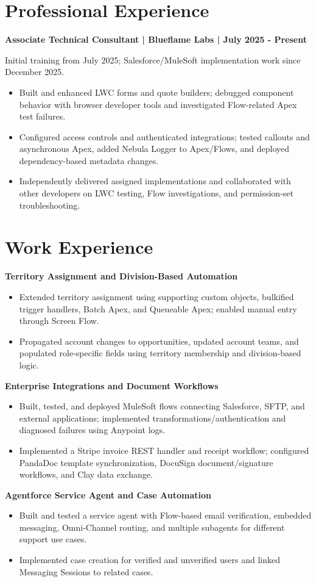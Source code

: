 \documentclass[a4paper,11pt]{article}
\begin{document}
\section{Professional Experience}
\textbf{Associate Technical Consultant | Blueflame Labs | July 2025 - Present}\par
Initial training from July 2025; Salesforce/MuleSoft implementation work since December 2025.\par
\begin{itemize}
\item Built and enhanced LWC forms and quote builders; debugged component behavior with browser developer tools and investigated Flow-related Apex test failures.
\item Configured access controls and authenticated integrations; tested callouts and asynchronous Apex, added Nebula Logger to Apex/Flows, and deployed dependency-based metadata changes.
\item Independently delivered assigned implementations and collaborated with other developers on LWC testing, Flow investigations, and permission-set troubleshooting.
\end{itemize}
\section{Work Experience}
\textbf{Territory Assignment and Division-Based Automation}\par
\begin{itemize}
\item Extended territory assignment using supporting custom objects, bulkified trigger handlers, Batch Apex, and Queueable Apex; enabled manual entry through Screen Flow.
\item Propagated account changes to opportunities, updated account teams, and populated role-specific fields using territory membership and division-based logic.
\end{itemize}
\textbf{Enterprise Integrations and Document Workflows}\par
\begin{itemize}
\item Built, tested, and deployed MuleSoft flows connecting Salesforce, SFTP, and external applications; implemented transformations/authentication and diagnosed failures using Anypoint logs.
\item Implemented a Stripe invoice REST handler and receipt workflow; configured PandaDoc template synchronization, DocuSign document/signature workflows, and Clay data exchange.
\end{itemize}
\textbf{Agentforce Service Agent and Case Automation}\par
\begin{itemize}
\item Built and tested a service agent with Flow-based email verification, embedded messaging, Omni-Channel routing, and multiple subagents for different support use cases.
\item Implemented case creation for verified and unverified users and linked Messaging Sessions to related cases.
\end{itemize}
\end{document}
